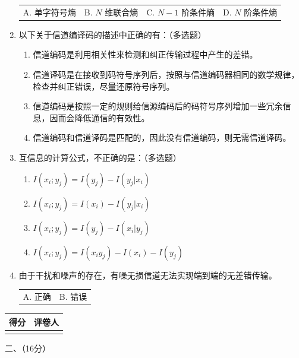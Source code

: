 \documentclass[UTF8,a4paper,12pt]{ctexart}
\begin{document}
\begin{enumerate}[label=\arabic*., leftmargin=2em, itemsep=1.4em]
\begin{tabular}{@{}p{}p{}p{}p{}@{}}
A. 单字符号熵 & B. $N$ 维联合熵 & C. $N-1$ 阶条件熵 & D. $N$ 阶条件熵
\end{tabular}


\item 以下关于信道编译码的描述中正确的有：（多选题）

\begin{enumerate}[label=\Alph*. , leftmargin=2em, itemsep=0.4em]
\item 信道编码是利用相关性来检测和纠正传输过程中产生的差错。
\item 信道译码是在接收到码符号序列后，按照与信道编码器相同的数学规律，检查并纠正错误，尽量还原符号序列。
\item 信道编码是按照一定的规则给信源编码后的码符号序列增加一些冗余信息，因而会降低通信的有效性。
\item 信道编码和信道译码是匹配的，因此没有信道编码，则无需信道译码。
\end{enumerate}


\item 互信息的计算公式，不正确的是：（多选题）

\begin{enumerate}[label=\Alph*. , leftmargin=2em, itemsep=0.4em]
\item $I(x_i;y_j)=I(y_j)-I(y_j|x_i)$
\item $I(x_i;y_j)=I(x_i)-I(y_j|x_i)$
\item $I(x_i;y_j)=I(y_j)-I(x_i|y_j)$
\item $I(x_i;y_j)=I(x_i y_j)-I(x_i)-I(y_j)$
\end{enumerate}


\item 由于干扰和噪声的存在，有噪无损信道无法实现端到端的无差错传输。

\begin{tabular}{@{}p{}p{}@{}}
A. 正确 & B. 错误
\end{tabular}


\end{enumerate}

\vspace{2.8em}

\noindent
\begin{minipage}[t]{0.25\textwidth}
\renewcommand{\arraystretch}{1.5}
\begin{tabular}{|C{1.5cm}|C{2.3cm}|}
\hline
得分 & 评卷人 \\
\hline
\rule{0pt}{0.8cm}&  \\
\hline
\end{tabular}
\end{minipage}
\begin{minipage}[t]{0.72\textwidth}
\vspace{1.0cm}
\begin{center}
{\heiti 二、（16分）}
\end{center}
\end{minipage}
\end{document}
